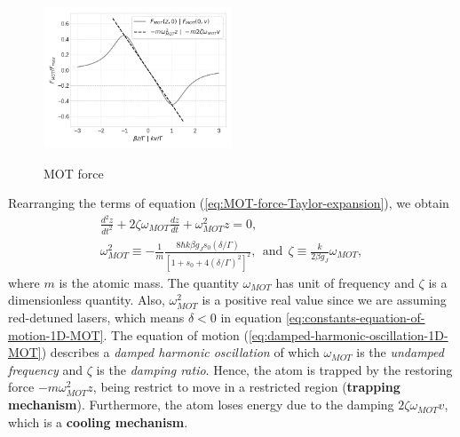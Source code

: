 \begin{figure}[!ht]
	\centering
	\caption{MOT force}
	\includegraphics[width=0.5\textwidth]{USPSC-img/MOT_force.png}
	\label{fig:MOT-force}
\end{figure}

Rearranging the terms of equation (\ref{eq:MOT-force-Taylor-expansion}), we obtain
\begin{gather}
	\frac{d^2 z}{dt^2} + 2\zeta \omega_{MOT} \frac{d z}{d t} + \omega_{MOT}^2 z = 0,
	\label{eq:damped-harmonic-oscillation-1D-MOT}
	\\
	\omega_{MOT}^2 \equiv - \frac{1}{m} \frac{8 \hbar k \beta g_J s_0 (\delta / \Gamma)}{[1 + s_0 + 4(\delta / \Gamma)^2]^2},\ \ \textrm{and}\ \ \zeta \equiv \frac{k}{2\beta g_J} \omega_{MOT},
	\label{eq:constants-equation-of-motion-1D-MOT}
\end{gather}
where $ m $ is the atomic mass. The quantity $ \omega_{MOT} $ has unit of frequency and $ \zeta $ is a dimensionless quantity. Also, $ \omega_{MOT}^2 $ is a positive real value since we are assuming red-detuned lasers, which means $ \delta < 0 $ in equation \ref{eq:constants-equation-of-motion-1D-MOT}. The equation of motion (\ref{eq:damped-harmonic-oscillation-1D-MOT}) describes a \textit{damped harmonic oscillation} of which $ \omega_{MOT} $ is the \textit{undamped frequency} and $ \zeta $ is the \textit{damping ratio}. Hence, the atom is trapped by the restoring force $ - m \omega_{MOT}^2 z $, being restrict to move in a restricted region (\textbf{trapping mechanism}). Furthermore, the atom loses energy due to the damping $ 2 \zeta \omega_{MOT} v $, which is a \textbf{cooling mechanism}.